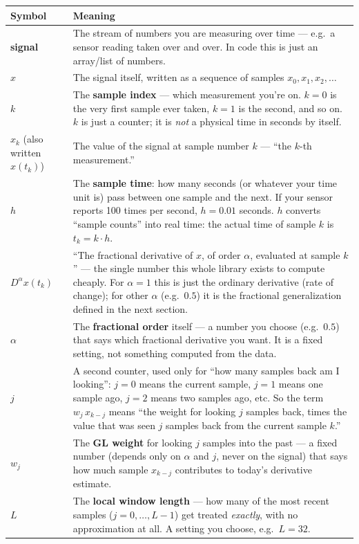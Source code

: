 \documentclass[11pt]{article}
\begin{document}
\begin{center}
\small
\begin{tabularx}{\textwidth}{lX}
\toprule
Symbol & Meaning \\
\midrule
\textbf{signal} & The stream of numbers you are measuring over time --- e.g.\ a sensor reading taken over and over. In code this is just an array/list of numbers. \\
$x$ & The signal itself, written as a sequence of samples $x_0, x_1, x_2, \dots$ \\
$k$ & The \textbf{sample index} --- which measurement you're on. $k=0$ is the very first sample ever taken, $k=1$ is the second, and so on. $k$ is just a counter; it is \emph{not} a physical time in seconds by itself. \\
$x_k$ (also written $x(t_k)$) & The value of the signal at sample number $k$ --- ``the $k$-th measurement.'' \\
$h$ & The \textbf{sample time}: how many seconds (or whatever your time unit is) pass between one sample and the next. If your sensor reports 100 times per second, $h=0.01$ seconds. $h$ converts ``sample counts'' into real time: the actual time of sample $k$ is $t_k = k\cdot h$. \\
$D^\alpha x(t_k)$ & ``The fractional derivative of $x$, of order $\alpha$, evaluated at sample $k$'' --- the single number this whole library exists to compute cheaply. For $\alpha=1$ this is just the ordinary derivative (rate of change); for other $\alpha$ (e.g.\ $0.5$) it is the fractional generalization defined in the next section. \\
$\alpha$ & The \textbf{fractional order} itself --- a number you choose (e.g.\ $0.5$) that says which fractional derivative you want. It is a fixed setting, not something computed from the data. \\
$j$ & A second counter, used only for ``how many samples back am I looking'': $j=0$ means the current sample, $j=1$ means one sample ago, $j=2$ means two samples ago, etc. So the term $w_j\,x_{k-j}$ means ``the weight for looking $j$ samples back, times the value that was seen $j$ samples back from the current sample $k$.'' \\
$w_j$ & The \textbf{GL weight} for looking $j$ samples into the past --- a fixed number (depends only on $\alpha$ and $j$, never on the signal) that says how much sample $x_{k-j}$ contributes to today's derivative estimate. \\
$L$ & The \textbf{local window length} --- how many of the most recent samples ($j=0,\dots,L-1$) get treated \emph{exactly}, with no approximation at all. A setting you choose, e.g.\ $L=32$. \\

\end{tabularx}
\end{center}
\end{document}
